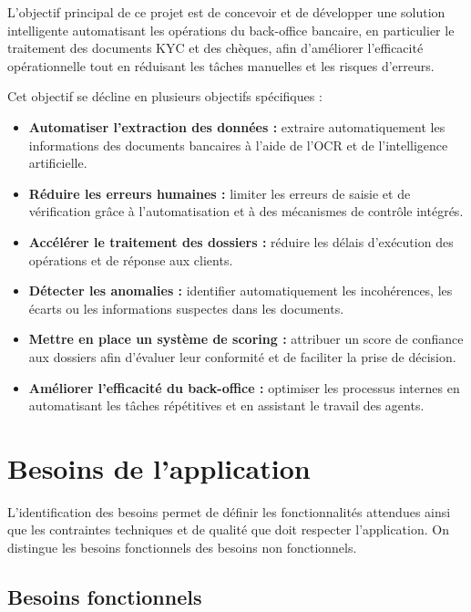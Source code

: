L'objectif principal de ce projet est de concevoir et de développer une
solution intelligente automatisant les opérations du back-office bancaire,
en particulier le traitement des documents KYC et des chèques, afin
d'améliorer l'efficacité opérationnelle tout en réduisant les tâches
manuelles et les risques d'erreurs.

Cet objectif se décline en plusieurs objectifs spécifiques :

\begin{itemize}
    \item \textbf{Automatiser l'extraction des données :} extraire
    automatiquement les informations des documents bancaires à l'aide de
    l'OCR et de l'intelligence artificielle.
    \item \textbf{Réduire les erreurs humaines :} limiter les erreurs de
    saisie et de vérification grâce à l'automatisation et à des mécanismes de
    contrôle intégrés.
    \item \textbf{Accélérer le traitement des dossiers :} réduire les délais
    d'exécution des opérations et de réponse aux clients.
    \item \textbf{Détecter les anomalies :} identifier automatiquement les
    incohérences, les écarts ou les informations suspectes dans les documents.
    \item \textbf{Mettre en place un système de scoring :} attribuer un score
    de confiance aux dossiers afin d'évaluer leur conformité et de faciliter
    la prise de décision.
    \item \textbf{Améliorer l'efficacité du back-office :} optimiser les
    processus internes en automatisant les tâches répétitives et en assistant
    le travail des agents.
\end{itemize}

\section{Besoins de l'application}

L'identification des besoins permet de définir les fonctionnalités attendues
ainsi que les contraintes techniques et de qualité que doit respecter
l'application. On distingue les besoins fonctionnels des besoins non
fonctionnels.

\subsection*{Besoins fonctionnels}

